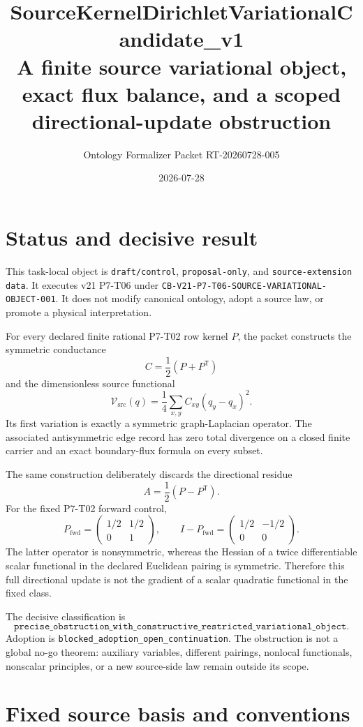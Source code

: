 \documentclass[11pt]{article}
\title{SourceKernelDirichletVariationalCandidate\_v1\\
\large A finite source variational object, exact flux balance, and a scoped
directional-update obstruction}
\author{Ontology Formalizer Packet RT-20260728-005}
\date{2026-07-28}
\newcommand{\Vsrc}{\mathcal V_{\mathrm{src}}}
\begin{document}
\maketitle

\section{Status and decisive result}

This task-local object is \texttt{draft/control}, \texttt{proposal-only},
and \texttt{source-extension data}.  It executes v21 P7-T06 under
\texttt{CB-V21-P7-T06-SOURCE-VARIATIONAL-OBJECT-001}.  It does not modify
canonical ontology, adopt a source law, or promote a physical interpretation.

For every declared finite rational P7-T02 row kernel \(P\), the packet
constructs the symmetric conductance
\[
 C=\frac12(P+P^{\mathsf T})
\]
and the dimensionless source functional
\[
 \Vsrc(q)=\frac14\sum_{x,y}C_{xy}(q_y-q_x)^2 .
\]
Its first variation is exactly a symmetric graph-Laplacian operator.  The
associated antisymmetric edge record has zero total divergence on a closed
finite carrier and an exact boundary-flux formula on every subset.

The same construction deliberately discards the directional residue
\[
 A=\frac12(P-P^{\mathsf T}).
\]
For the fixed P7-T02 forward control,
\[
 P_{\mathrm{fwd}}=
 \begin{pmatrix}
 1/2&1/2\\
 0&1
 \end{pmatrix},
 \qquad
 I-P_{\mathrm{fwd}}=
 \begin{pmatrix}
 1/2&-1/2\\
 0&0
 \end{pmatrix}.
\]
The latter operator is nonsymmetric, whereas the Hessian of a twice
differentiable scalar functional in the declared Euclidean pairing is
symmetric.  Therefore this full directional update is not the gradient of a
scalar quadratic functional in the fixed class.

The decisive classification is
\[
 \texttt{precise\_obstruction\_with\_constructive\_restricted\_variational\_object}.
\]
Adoption is \texttt{blocked\_adoption\_open\_continuation}.  The obstruction
is not a global no-go theorem: auxiliary variables, different pairings,
nonlocal functionals, nonscalar principles, or a new source-side law remain
outside its scope.

\section{Fixed source basis and conventions}
\end{document}
